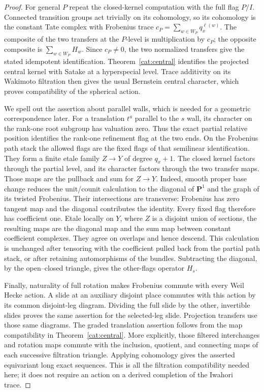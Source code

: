 \begin{proof}
For general $P$ repeat the closed-kernel computation with the
full flag $P/I$. Connected transition groups act trivially
on its cohomology, so its cohomology is the constant Tate
complex with Frobenius trace
$c_P=\sum_{w\in W_P}q_x^{\ell(w)}$. The composite of the
two transfers at the $P$-level is multiplication by $c_P$;
the opposite composite is $\sum_{w\in W_P}H_w$.
Since $c_P\ne0$, the two normalized transfers give the
stated idempotent identification. Theorem~\ref{cat:central}
identifies the projected central kernel with Satake at a
hyperspecial level. Trace additivity on its Wakimoto
filtration then gives the usual Bernstein central character,
which proves compatibility of the spherical action.

We spell out the assertion about parallel walls, which is
needed for a geometric correspondence later. For a translation
$t^a$ parallel to the $s$ wall, its character on the rank-one
root subgroup has valuation zero. Thus the exact partial
relative position identifies the rank-one refinement flag at
the two ends. On the Frobenius path stack the allowed flags
are the fixed flags of that semilinear identification. They
form a finite etale family $Z\to Y$ of degree $q_x+1$.
The closed kernel factors through the partial level, and
its character factors through the two transfer maps.
Those maps are the pullback and sum for $Z\to Y$.
Indeed, smooth proper base change reduces the unit/counit
calculation to the diagonal of $\mathbf P^1$ and the graph
of its twisted Frobenius. Their intersections are transverse:
Frobenius has zero tangent map and the diagonal contributes
the identity. Every fixed flag therefore has coefficient
one. Etale locally on $Y$, where $Z$ is a disjoint union of
sections, the resulting maps are the diagonal map and the
sum map between constant coefficient complexes. They agree
on overlaps and hence descend. This calculation is unchanged
after tensoring with the coefficient pulled back from the
partial path stack, or after retaining automorphisms of the
bundles. Subtracting the diagonal, by the open--closed
triangle, gives the other-flags operator $H_s$.

Finally, naturality of full rotation makes Frobenius commute
with every Weil Hecke action. A slide at an auxiliary disjoint
place commutes with this action by its common disjoint-leg
diagram. Dividing the full slide by the other, invertible
slides proves the same assertion for the selected-leg slide.
Projection transfers use those same diagrams. The graded
translation assertion follows from the map compatibility in
Theorem~\ref{cat:central}. More explicitly, those filtered
interchanges and rotation maps commute with the inclusion,
quotient, and connecting maps of each successive filtration
triangle. Applying cohomology gives the asserted equivariant
long exact sequences. This is all the filtration compatibility
needed here; it does not require an action on a derived
completion of the Iwahori trace.
\end{proof}

